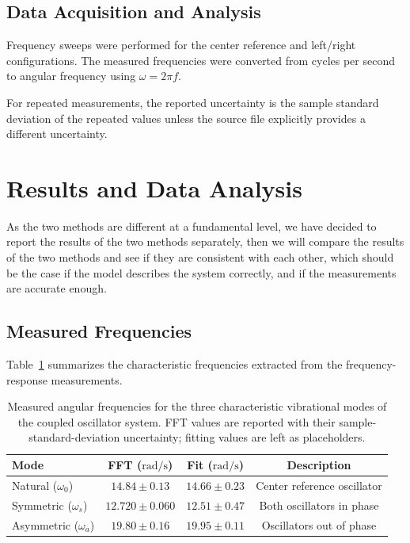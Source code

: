 \documentclass[a4paper,11pt]{article}
\begin{document}
\subsection{Data Acquisition and Analysis}
Frequency sweeps were performed for the center reference and left/right configurations. The measured frequencies were converted from cycles per second to angular frequency using $\omega = 2\pi f$.

For repeated measurements, the reported uncertainty is the sample standard deviation of the repeated values unless the source file explicitly provides a different uncertainty.

\section{Results and Data Analysis}
As the two methods are different at a fundamental level, we have decided to report the results of the two methods separately,
then we will compare the results of the two methods and see if they are consistent with each other, which should be the case
if the model describes the system correctly, and if the measurements are accurate enough.

\subsection{Measured Frequencies}
Table~\ref{tab:frequencies} summarizes the characteristic frequencies extracted from the frequency-response measurements.

\begin{table}[H]
\centering
\begin{tabular}{lccc}
\toprule
\textbf{Mode} & \textbf{FFT ($\mathrm{rad/s}$)} & \textbf{Fit ($\mathrm{rad/s}$)} & \textbf{Description} \\
\midrule
Natural ($\omega_0$) & $14.84 \pm 0.13$ & $14.66\pm0.23$ & Center reference oscillator \\
Symmetric ($\omega_s$) & $12.720 \pm 0.060$ & $12.51\pm0.47$ & Both oscillators in phase \\
Asymmetric ($\omega_a$) & $19.80 \pm 0.16$ & $19.95\pm0.11$ & Oscillators out of phase \\
\bottomrule
\end{tabular}
\caption{Measured angular frequencies for the three characteristic vibrational modes of the coupled oscillator system. FFT values are reported with their sample-standard-deviation uncertainty; fitting values are left as placeholders.}
\label{tab:frequencies}
\end{table}
\end{document}
